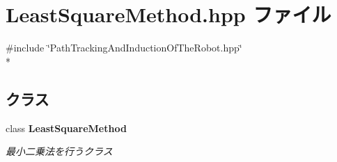 \section{Least\-Square\-Method.\-hpp ファイル}
\label{_least_square_method_8hpp}
{\ttfamily \#include \char`\"{}Path\-Tracking\-And\-Induction\-Of\-The\-Robot.\-hpp\char`\"{}}\\*
\subsection*{クラス}
\begin{DoxyCompactItemize}
\item 
class {\bf Least\-Square\-Method}
\begin{DoxyCompactList}\small\item\em 最小二乗法を行うクラス \end{DoxyCompactList}\end{DoxyCompactItemize}
